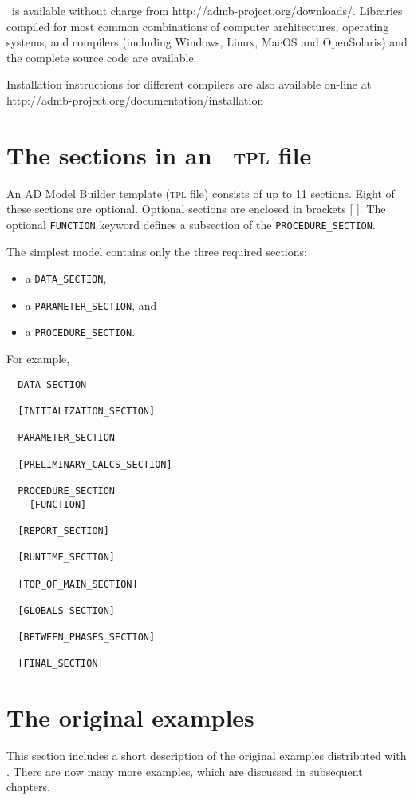 \documentclass{admbmanual}
\newcommand\DS{\texttt{DATA\_SECTION}}
\newcommand\PS{\texttt{PARAMETER\_SECTION}}
\newcommand\PROS{\texttt{PROCEDURE\_SECTION}}
\begin{document}
\ADM\ is available without charge from http://admb-project.org/downloads/.
Libraries compiled for most common combinations of computer architectures,
operating systems, and compilers (including Windows, Linux, MacOS and
OpenSolaris) and the complete source code are available.

Installation instructions for different compilers are also available on-line
at\\
http://admb-project.org/documentation/installation

\section{The sections in an \ADMS\ \textsc{tpl} file}

An AD Model Builder template (\textsc{tpl} file) consists of up to 11 sections.
Eight of these sections are optional. Optional sections are
enclosed in brackets [ ]. The optional \texttt{FUNCTION} keyword defines a
subsection of the \PROS.

The simplest model contains only the three required sections:
\begin{itemize}
  \item a \DS,
  \item a \PS, and
  \item a \PROS.
\end{itemize}

For example,
\begin{lstlisting}
  DATA_SECTION

  [INITIALIZATION_SECTION]

  PARAMETER_SECTION

  [PRELIMINARY_CALCS_SECTION]

  PROCEDURE_SECTION
    [FUNCTION]

  [REPORT_SECTION]

  [RUNTIME_SECTION]

  [TOP_OF_MAIN_SECTION]

  [GLOBALS_SECTION]

  [BETWEEN_PHASES_SECTION]

  [FINAL_SECTION]
\end{lstlisting}

\section{The original \ADMS examples}

This section includes a short description of the original examples distributed
with \ADM. There are now many more examples, which are discussed in subsequent
chapters.
\end{document}

